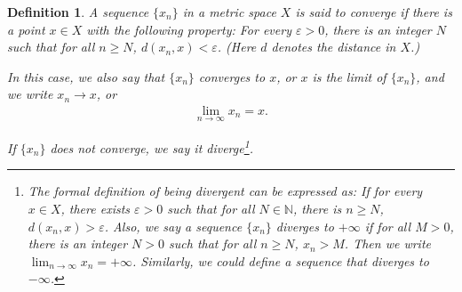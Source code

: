 \documentclass[11pt]{book}
\newtheorem{definition}{Definition}[chapter]
\theoremstyle{definition}
\numberwithin{equation}{chapter}
\begin{document}
\begin{definition}
A sequence $\{x_n\}$ in a metric space $X$ is said to converge if there is a point $x \in X$ with the following property: For every $\varepsilon > 0$, there is an integer $N$ such that for all $n \geq N$, $d(x_n,x) < \varepsilon$. (Here $d$ denotes the distance in $X$.)

In this case, we also say that $\{x_n\}$ converges to $x$, or $x$ is the limit of $\{x_n\}$, and we write $x_n \to x$, or
\begin{align*}
    \lim_{n\to\infty} x_n = x.
\end{align*}

If $\{x_n\}$ does not converge, we say it diverge\footnote{The formal definition of being divergent can be expressed as: If for every $x \in X$, there exists $\varepsilon > 0$ such that for all $N \in \mathbb{N}$, there is $n \geq N$, $d(x_n,x) > \varepsilon$. Also, we say a sequence $\{x_n\}$ diverges to $+\infty$ if for all $M > 0$, there is an integer $N > 0$ such that for all $n \geq N$, $x_n > M$. Then we write $\lim_{n\to\infty} x_n = + \infty$. Similarly, we could define a sequence that diverges to $-\infty$.}.
\end{definition}

\medskip
\end{document}
